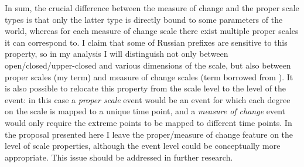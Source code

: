 In sum, the crucial difference between the measure of change and the proper scale types is that only the latter type is directly bound to some parameters of the world, whereas for each measure of change scale there exist multiple proper scales it can correspond to. I claim that some of Russian prefixes are sensitive to this property, so in my analysis I will distinguish not only between open\slash closed\slash upper-closed and various dimensions of the scale, but also between proper scales (my term) and measure of change scales (term borrowed from \citealt{KennedyLevin:08}). It is also possible to relocate this property from the scale level to the level of the event: in this case a \textit{proper scale} event would be an event for which each degree on the scale is mapped to a unique time point, and a \textit{measure of change} event would only require the extreme points to be mapped to different time points. In the proposal presented here I leave the proper/measure of change feature on the level of scale properties, although the event level could be conceptually more appropriate. This issue should be addressed in further research.


